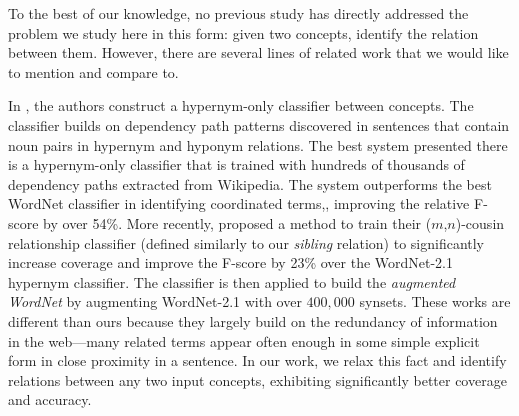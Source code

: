 To the best of our knowledge, no previous study has directly addressed
the problem we study here in this form: given two concepts, identify
the relation between them. However, there are several lines of related
work that we would like to mention and compare to.


In \cite{ilprints665}, the authors construct a hypernym-only
classifier between concepts. The classifier builds on dependency path
patterns discovered in sentences that contain noun pairs in hypernym
and hyponym relations. The best system presented there is a
hypernym-only classifier that is trained with hundreds of thousands of
dependency paths extracted from Wikipedia. The system outperforms the
best WordNet classifier in identifying coordinated terms,, improving
the relative F-score by over 54\%. More recently, \cite{Snow2006}
proposed a method to train their ($m$,$n$)-cousin relationship
classifier (defined similarly to our {\em sibling} relation) to
significantly increase coverage and improve the F-score by 23\%
over the WordNet-2.1 hypernym classifier. The classifier is then
applied to build the {\em augmented WordNet} by augmenting WordNet-2.1
with over $400,000$ synsets.  These works are different than ours
because they largely build on the redundancy of information in the
web---many related terms appear often enough in some simple explicit
form in close proximity in a sentence. In our work, we relax this fact
and identify relations between any two input concepts, exhibiting
significantly better coverage and accuracy.

